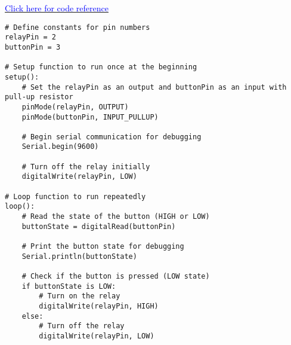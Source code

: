 \documentclass[table,french,english]{rapportCS}
\begin{document}
\href{https://github.com/naunidhsingh03/ELP305-TribeD-Resources/blob/5ba1988fe283faba21ba7098978bb225e509d5cb/Codes/solvent_spinkler_new_design_1.ino}{\textcolor{blue}{Click here for code reference}}
\begin{lstlisting}
# Define constants for pin numbers
relayPin = 2
buttonPin = 3

# Setup function to run once at the beginning
setup():
    # Set the relayPin as an output and buttonPin as an input with pull-up resistor
    pinMode(relayPin, OUTPUT)
    pinMode(buttonPin, INPUT_PULLUP)
    
    # Begin serial communication for debugging
    Serial.begin(9600)
    
    # Turn off the relay initially
    digitalWrite(relayPin, LOW)

# Loop function to run repeatedly
loop():
    # Read the state of the button (HIGH or LOW)
    buttonState = digitalRead(buttonPin)
    
    # Print the button state for debugging
    Serial.println(buttonState)
    
    # Check if the button is pressed (LOW state)
    if buttonState is LOW:
        # Turn on the relay
        digitalWrite(relayPin, HIGH)
    else:
        # Turn off the relay
        digitalWrite(relayPin, LOW)
\end{lstlisting}
\end{document}
